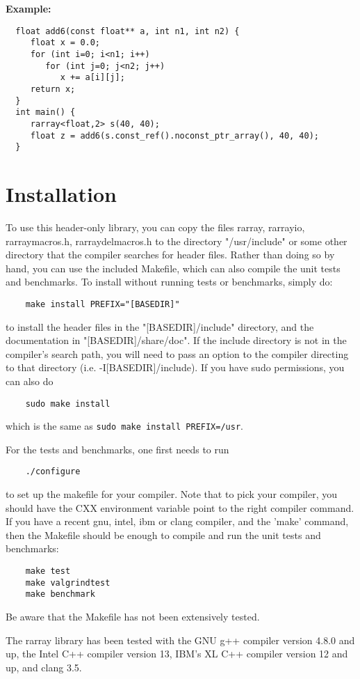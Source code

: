 \documentclass[11pt,twoside]{article}
\begin{document}
\noindent
{\bf Example:}
\vspace{-5pt}\begin{framed}\vspace{-14pt}%
\begin{verbatim}
  float add6(const float** a, int n1, int n2) {
     float x = 0.0;
     for (int i=0; i<n1; i++)
        for (int j=0; j<n2; j++)
           x += a[i][j];
     return x;
  }
  int main() {
     rarray<float,2> s(40, 40);
     float z = add6(s.const_ref().noconst_ptr_array(), 40, 40);
  }
\end{verbatim}%
\vspace{-14pt} 
\end{framed}

\pagebreak
\appendix

\section{Installation}

To use this header-only library, you can copy the files rarray, rarrayio,
rarraymacros.h, rarraydelmacros.h to the directory "/usr/include" or
some other directory that the compiler searches for header files.
Rather than doing so by hand, you can use the included Makefile, which
can also compile the unit tests and benchmarks.  To install without
running tests or benchmarks, simply do:

\begin{verbatim}
    make install PREFIX="[BASEDIR]"
\end{verbatim}
to install the header files in the "[BASEDIR]/include" directory, and
the documentation in \linebreak "[BASEDIR]/share/doc".  If the include directory
is not in the compiler's search path, you will need to pass an option
to the compiler directing to that directory
(i.e. -I[BASEDIR]/include). If you have sudo permissions, you can also do
\begin{verbatim}
    sudo make install
\end{verbatim}
which is the same as \texttt{sudo make install PREFIX=/usr}.

For the tests and benchmarks, one first needs to run
\begin{verbatim}
    ./configure
\end{verbatim}
to set up the makefile for your compiler. 
Note that to pick your compiler, you should have the CXX environment
variable point to the right compiler command. 
If you have a recent gnu, intel, ibm or clang compiler, and the 'make'
command, then the Makefile should be enough to compile and run the
unit tests and benchmarks:
\begin{verbatim}
    make test
    make valgrindtest
    make benchmark
\end{verbatim}
Be aware that the Makefile has not been extensively tested.

The rarray library has been tested with the GNU g++ compiler version
4.8.0 and up, the Intel C++ compiler version 13, IBM's XL C++ compiler
version 12 and up, and clang 3.5.
\end{document}
